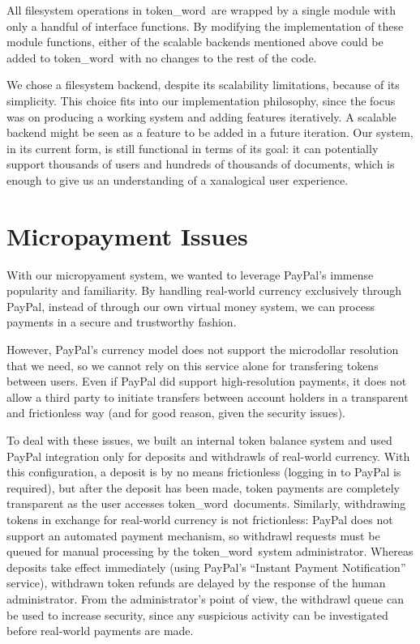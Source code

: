 \documentclass{acm_proc_article-sp}
\newcommand{\tw}{token\_word}
\begin{document}
All filesystem operations in \tw \  are wrapped by a single module with only a handful of interface functions.
By modifying the implementation of these module functions, either of the scalable backends mentioned above could be added to \tw \  with no changes to the rest of the code. 

We chose a filesystem backend, despite its scalability limitations, because of its simplicity.
This choice fits into our implementation philosophy, since the focus was on producing a working system and adding features iteratively.
A scalable backend might be seen as a feature to be added in a future iteration.
Our system, in its current form, is still functional in terms of its goal:  it can potentially support thousands of users and hundreds of thousands of documents, which is enough to give us an understanding of a xanalogical user experience.






\section{Micropayment Issues}
With our micropyament system, we wanted to leverage PayPal's \cite{paypal} immense popularity and familiarity.
By handling real-world currency exclusively through PayPal, instead of through our own virtual money system, we can process payments in a secure and trustworthy fashion.

However, PayPal's currency model does not support the microdollar resolution that we need, so we cannot rely on this service alone for transfering tokens between users.
Even if PayPal did support high-resolution payments, it does not allow a third party to initiate transfers between account holders in a transparent and frictionless way (and for good reason, given the security issues).

To deal with these issues, we built an internal token balance system and used PayPal integration only for deposits and withdrawls of real-world currency.
With this configuration, a deposit is by no means frictionless (logging in to PayPal is required), but after the deposit has been made, token payments are completely transparent as the user accesses \tw \  documents.
Similarly, withdrawing tokens in exchange for real-world currency is not frictionless: 
PayPal does not support an automated payment mechanism, so withdrawl requests must be queued for manual processing by the \tw \  system administrator.
Whereas deposits take effect immediately (using PayPal's ``Instant Payment Notification'' service), withdrawn token refunds are delayed by the response of the human administrator.
From the administrator's point of view, the withdrawl queue can be used to increase security, since any suspicious activity can be investigated before real-world payments are made.  
\end{document}
